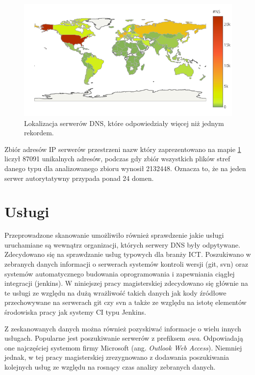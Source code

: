 \begin{figure}[ht]
\centering
\includegraphics[width=1.0\textwidth]{image/many_lines_map_no_title}
\caption{Lokalizacja serwerów DNS, które odpowiedziały więcej niż jednym rekordem.}
\label{fig:many_lines_map}
\end{figure}

Zbiór adresów IP serwerów przestrzeni nazw który zaprezentowano na mapie \ref{fig:many_lines_map} liczył 87091 unikalnych adresów, podczas
gdy zbiór wszystkich plików stref danego typu dla analizowanego zbioru wynosił 2132448. Oznacza to, że na jeden serwer autorytatywny
przypada ponad 24 domen.

\section{Usługi}
Przeprowadzone skanowanie umożliwiło również sprawdzenie jakie usługi uruchamiane są wewnątrz organizacji, których serwery DNS
były odpytywane. Zdecydowano się na sprawdzanie usług typowych dla branży ICT. Poszukiwano w zebranych danych informacji o serwerach
systemów kontroli wersji (git, svn) oraz systemów automatycznego budowania oprogramowania i zapewniania ciągłej integracji (jenkins).
W niniejszej pracy magisterskiej zdecydowano się głównie na te usługi ze względu na dużą wrażliwość takich danych jak kody źródłowe
przechowywane na serwerach git czy svn a także ze względu na istotę elementów środowiska pracy jak systemy CI typu Jenkins.

Z zeskanowanych danych można również pozyskiwać informacje o wielu innych usługach. Popularne jest poszukiwanie serwerów z prefiksem
\textit{owa}. Odpowiadają one najczęściej systemom firmy Microsoft (ang. \textit{Outlook Web Access}). Niemniej jednak, w tej pracy
magisterskiej zrezygnowano z dodawania poszukiwania kolejnych usług ze względu na rosnący czas analizy zebranych danych.

